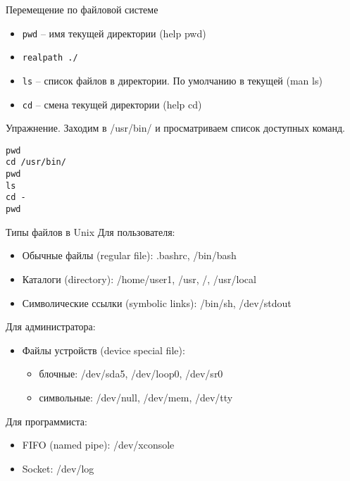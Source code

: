 \begin{frame}[fragile]{Перемещение по файловой системе}
      \begin{itemize}
      \item {\tt pwd} -- имя текущей директории (help pwd)
      \item {\tt realpath ./}
		  \item {\tt ls} -- список файлов в директории. По умолчанию в текущей (man ls)
		  \item {\tt cd} -- смена текущей директории (help cd)
      \end{itemize}
      \begin{block}{Упражнение. Заходим в /usr/bin/ и просматриваем список доступных команд.}
\begin{lstlisting}
pwd
cd /usr/bin/
pwd
ls
cd -
pwd
\end{lstlisting}
      \end{block}
\end{frame}


%
%
%
%
%
%

\begin{frame}{Типы файлов в Unix}
  Для пользователя:
  \begin{itemize}
    \item \alert{Обычные файлы (regular file)}: .bashrc, /bin/bash
    \item \alert{Каталоги (directory)}: /home/user1, /usr, /, /usr/local  \pause
    \item \alert{Символические ссылки (symbolic links)}: /bin/sh, /dev/stdout
  \end{itemize} \pause
  Для администратора:
  \begin{itemize}
    \item \alert{Файлы устройств (device special file)}:
      \begin{itemize}
        \item \alert{блочные}: /dev/sda5, /dev/loop0, /dev/sr0
        \item \alert{символьные}: /dev/null, /dev/mem, /dev/tty
      \end{itemize}
  \end{itemize} \pause
  Для программиста:
  \begin{itemize}
    \item \alert{FIFO (named pipe)}: /dev/xconsole
    \item \alert{Socket}: /dev/log
  \end{itemize}

\end{frame}

